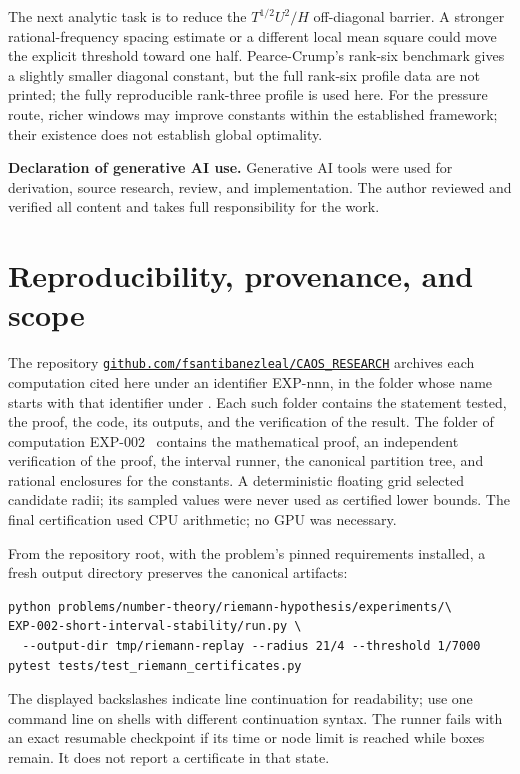 \documentclass[11pt]{article}
\theoremstyle{remark}
\begin{document}
The next analytic task is to reduce the $T^{1/2}U^2/H$ off-diagonal barrier.
A stronger rational-frequency spacing estimate or a different local mean
square could move the explicit threshold toward one half. Pearce-Crump's
rank-six benchmark gives a slightly smaller diagonal constant, but the full
rank-six profile data are not printed; the fully reproducible rank-three
profile is used here. For the pressure route, richer windows may improve
constants within the established framework; their existence does not
establish global optimality.

\medskip
\noindent\textbf{Declaration of generative AI use.} Generative AI tools
were used for derivation, source research, review, and implementation.
The author reviewed and verified all content and takes full
responsibility for the work.

\appendix
\section{Reproducibility, provenance, and scope}

The repository
\href{https://github.com/fsantibanezleal/CAOS_RESEARCH}{\nolinkurl{github.com/fsantibanezleal/CAOS_RESEARCH}}
archives each computation cited here under an identifier EXP-nnn, in the
folder whose name starts with that identifier under
. Each such
folder contains the statement tested, the proof, the code, its outputs,
and the verification of the result. The folder of computation
EXP-002~\cite{Record} contains the mathematical proof, an independent
verification of the proof, the interval runner, the canonical partition
tree, and rational enclosures for the constants. A
deterministic floating grid selected candidate radii; its sampled values
were never used as certified lower bounds. The final certification used
CPU arithmetic; no GPU was necessary.

From the repository root, with the problem's pinned requirements installed,
a fresh output directory preserves the canonical artifacts:
\begin{verbatim}
python problems/number-theory/riemann-hypothesis/experiments/\
EXP-002-short-interval-stability/run.py \
  --output-dir tmp/riemann-replay --radius 21/4 --threshold 1/7000
pytest tests/test_riemann_certificates.py
\end{verbatim}
The displayed backslashes indicate line continuation for readability;
use one command line on shells with different continuation syntax.
The runner fails with an exact resumable checkpoint if its time or node
limit is reached while boxes remain. It does not report a certificate in
that state.
\end{document}
